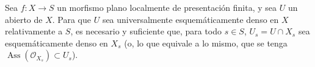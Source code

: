 \begin{proposition}[11.10.10]
\label{IV.11.10.10}
Sea $f:X\to S$ un morfismo plano localmente de presentación finita, y sea $U$ un abierto de $X$.
Para que $U$ sea universalmente esquemáticamente denso en $X$ relativamente a $S$, es necesario y suficiente que, para todo $s\in S$, $U_s=U\cap X_s$ sea esquemáticamente denso en $X_s$ (o, lo que equivale a lo mismo, que se tenga $\operatorname{Ass}(\mathcal O_{X_s})\subset U_s$).
\end{proposition}
